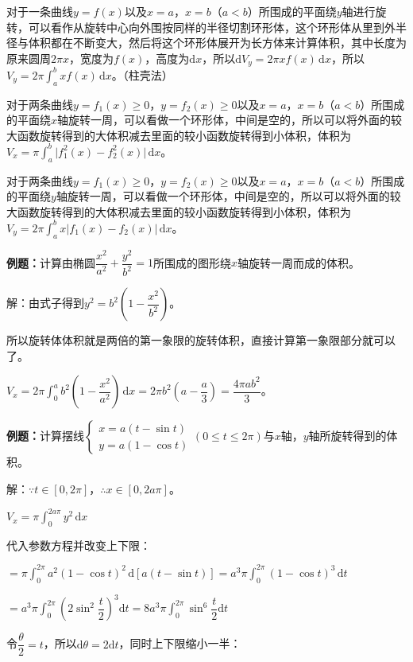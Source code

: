 \documentclass[UTF8, 12pt]{ctexart}
\begin{document}
对于一条曲线$y=f(x)$以及$x=a$，$x=b$（$a<b$）所围成的平面绕$y$轴进行旋转，可以看作从旋转中心向外围按同样的半径切割环形体，这个环形体从里到外半径与体积都在不断变大，然后将这个环形体展开为长方体来计算体积，其中长度为原来圆周$2\pi x$，宽度为$f(x)$，高度为$\textrm{d}x$，所以$\textrm{d}V_y=2\pi xf(x)\,\textrm{d}x$，所以$V_y=2\pi\int_a^bxf(x)\,\textrm{d}x$。（柱壳法）

对于两条曲线$y=f_1(x)\geqslant0$，$y=f_2(x)\geqslant0$以及$x=a$，$x=b$（$a<b$）所围成的平面绕$x$轴旋转一周，可以看做一个环形体，中间是空的，所以可以将外面的较大函数旋转得到的大体积减去里面的较小函数旋转得到小体积，体积为$V_x=\pi\int_a^b\vert f_1^2(x)-f_2^2(x)\vert\,\textrm{d}x$。

对于两条曲线$y=f_1(x)\geqslant0$，$y=f_2(x)\geqslant0$以及$x=a$，$x=b$（$a<b$）所围成的平面绕$y$轴旋转一周，可以看做一个环形体，中间是空的，所以可以将外面的较大函数旋转得到的大体积减去里面的较小函数旋转得到小体积，体积为$V_y=2\pi\int_a^bx\vert f_1(x)-f_2(x)\vert\,\textrm{d}x$。

\textbf{例题：}计算由椭圆$\dfrac{x^2}{a^2}+\dfrac{y^2}{b^2}=1$所围成的图形绕$x$轴旋转一周而成的体积。

解：由式子得到$y^2=b^2\left(1-\dfrac{x^2}{b^2}\right)$。

所以旋转体体积就是两倍的第一象限的旋转体积，直接计算第一象限部分就可以了。

$V_x=2\pi\displaystyle{\int_0^ab^2\left(1-\dfrac{x^2}{a^2}\right)\,\textrm{d}x}=2\pi b^2\left(a-\dfrac{a}{3}\right)=\dfrac{4\pi ab^2}{3}$。

\textbf{例题：}计算摆线$\left\{\begin{array}{l}
    x=a(t-\sin t) \\
    y=a(1-\cos t)
\end{array}
\right.$$(0\leqslant t\leqslant 2\pi)$与$x$轴，$y$轴所旋转得到的体积。

解：$\because t\in[0,2\pi]$，$\therefore x\in[0,2a\pi]$。

$V_x=\pi\int_0^{2a\pi}y^2\,\textrm{d}x$

代入参数方程并改变上下限：

$=\pi\int_0^{2\pi}a^2(1-\cos t)^2\,\textrm{d}[a(t-\sin t)]=a^3\pi\int_0^{2\pi}(1-\cos t)^3\,\textrm{d}t$

$=a^3\pi\displaystyle{\int_0^{2\pi}\left(2\sin^2\dfrac{t}{2}\right)^3\textrm{d}t}=8a^3\pi\displaystyle{\int_0^{2\pi}\sin^6\dfrac{t}{2}\textrm{d}t}$

令$\dfrac{\theta}{2}=t$，所以$\textrm{d}\theta=2\textrm{d}t$，同时上下限缩小一半：
\end{document}
